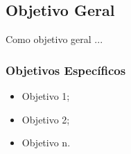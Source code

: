 \subsection{Objetivo Geral}
Como objetivo geral ...

\subsubsection{Objetivos Específicos}
\begin{itemize}
	\item Objetivo 1;
	\item Objetivo 2;
	\item Objetivo n.
\end{itemize}

